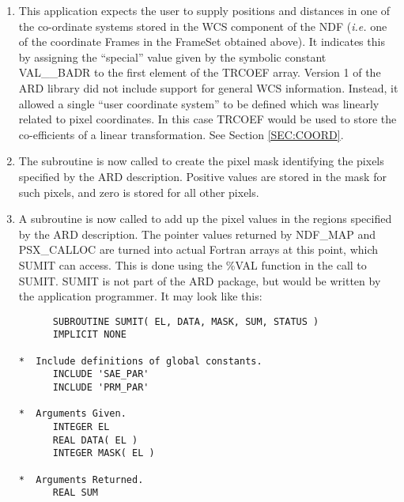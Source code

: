 \begin{enumerate}
\item This application expects the user to supply positions and distances in
one of the co-ordinate systems stored in the WCS component of the NDF
({\em i.e.} one of the coordinate Frames in the FrameSet obtained above).
It indicates this by assigning the ``special'' value given by the
symbolic constant VAL\_\_BADR to the first element of the TRCOEF array.
Version 1 of the ARD library did not include support for general WCS
information. Instead, it allowed a single ``user coordinate system'' to
be defined which was linearly related to pixel coordinates. In this case
TRCOEF would be used to store the co-efficients of a linear transformation. 
See Section \ref{SEC:COORD}.

\item The subroutine  is now called to create the pixel mask
identifying the pixels specified by the ARD description. Positive values are
stored in the mask for such pixels, and zero is stored for all other pixels. 

\item A subroutine is now called to add up the pixel values in the regions
specified by the ARD description. The pointer values returned by NDF\_MAP and
PSX\_CALLOC are turned into actual Fortran arrays at this point, which SUMIT can
access. This is done using the \%VAL function in the call to SUMIT. SUMIT
is not part of the ARD package, but would be written by the application
programmer. It may look like this: 

\small
\begin{verbatim}
      SUBROUTINE SUMIT( EL, DATA, MASK, SUM, STATUS )         
      IMPLICIT NONE                                           
                                                              
*  Include definitions of global constants.                   
      INCLUDE 'SAE_PAR'                                       
      INCLUDE 'PRM_PAR'                                        
                                                              
*  Arguments Given.                                           
      INTEGER EL                                              
      REAL DATA( EL )                                         
      INTEGER MASK( EL )                                      
                                                              
*  Arguments Returned.                                        
      REAL SUM                                                
                                                              

\end{verbatim}
\end{enumerate}
